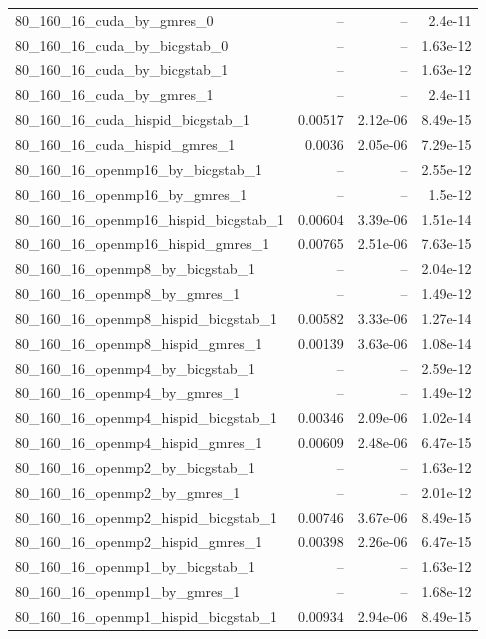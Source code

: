 \documentclass[11pt]{article}
\begin{document}
\begin{longtable}{lrrr}
80\_160\_16\_cuda\_by\_gmres\_0 & -- & -- & 2.4e-11\\
80\_160\_16\_cuda\_by\_bicgstab\_0 & -- & -- & 1.63e-12\\
80\_160\_16\_cuda\_by\_bicgstab\_1 & -- & -- & 1.63e-12\\
80\_160\_16\_cuda\_by\_gmres\_1 & -- & -- & 2.4e-11\\
80\_160\_16\_cuda\_hispid\_bicgstab\_1 & 0.00517 & 2.12e-06 & 8.49e-15\\
80\_160\_16\_cuda\_hispid\_gmres\_1 & 0.0036 & 2.05e-06 & 7.29e-15\\
80\_160\_16\_openmp16\_by\_bicgstab\_1 & -- & -- & 2.55e-12\\
80\_160\_16\_openmp16\_by\_gmres\_1 & -- & -- & 1.5e-12\\
80\_160\_16\_openmp16\_hispid\_bicgstab\_1 & 0.00604 & 3.39e-06 & 1.51e-14\\
80\_160\_16\_openmp16\_hispid\_gmres\_1 & 0.00765 & 2.51e-06 & 7.63e-15\\
80\_160\_16\_openmp8\_by\_bicgstab\_1 & -- & -- & 2.04e-12\\
80\_160\_16\_openmp8\_by\_gmres\_1 & -- & -- & 1.49e-12\\
80\_160\_16\_openmp8\_hispid\_bicgstab\_1 & 0.00582 & 3.33e-06 & 1.27e-14\\
80\_160\_16\_openmp8\_hispid\_gmres\_1 & 0.00139 & 3.63e-06 & 1.08e-14\\
80\_160\_16\_openmp4\_by\_bicgstab\_1 & -- & -- & 2.59e-12\\
80\_160\_16\_openmp4\_by\_gmres\_1 & -- & -- & 1.49e-12\\
80\_160\_16\_openmp4\_hispid\_bicgstab\_1 & 0.00346 & 2.09e-06 & 1.02e-14\\
80\_160\_16\_openmp4\_hispid\_gmres\_1 & 0.00609 & 2.48e-06 & 6.47e-15\\
80\_160\_16\_openmp2\_by\_bicgstab\_1 & -- & -- & 1.63e-12\\
80\_160\_16\_openmp2\_by\_gmres\_1 & -- & -- & 2.01e-12\\
80\_160\_16\_openmp2\_hispid\_bicgstab\_1 & 0.00746 & 3.67e-06 & 8.49e-15\\
80\_160\_16\_openmp2\_hispid\_gmres\_1 & 0.00398 & 2.26e-06 & 6.47e-15\\
80\_160\_16\_openmp1\_by\_bicgstab\_1 & -- & -- & 1.63e-12\\
80\_160\_16\_openmp1\_by\_gmres\_1 & -- & -- & 1.68e-12\\
80\_160\_16\_openmp1\_hispid\_bicgstab\_1 & 0.00934 & 2.94e-06 & 8.49e-15\\

\end{longtable}
\end{document}
